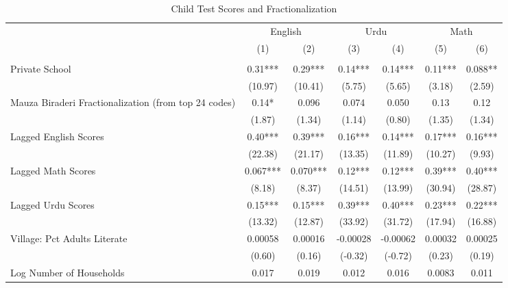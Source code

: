 \begin{sidewaystable}[htbp]\centering
\def\sym#1{\ifmmode^{#1}\else\(^{#1}\)\fi}
\caption{Child Test Scores and Fractionalization \label{kidsnointeract}}
\begin{tabular}{l*{6}{c}}
\toprule
                &\multicolumn{2}{c}{English}&\multicolumn{2}{c}{Urdu} &\multicolumn{2}{c}{Math} \\\cmidrule(lr){2-3}\cmidrule(lr){4-5}\cmidrule(lr){6-7}
                &\multicolumn{1}{c}{(1)}&\multicolumn{1}{c}{(2)}&\multicolumn{1}{c}{(3)}&\multicolumn{1}{c}{(4)}&\multicolumn{1}{c}{(5)}&\multicolumn{1}{c}{(6)}\\
                &\multicolumn{1}{c}{}&\multicolumn{1}{c}{}&\multicolumn{1}{c}{}&\multicolumn{1}{c}{}&\multicolumn{1}{c}{}&\multicolumn{1}{c}{}\\
\midrule
Private School  &     0.31***&     0.29***&     0.14***&     0.14***&     0.11***&    0.088** \\
                &  (10.97)   &  (10.41)   &   (5.75)   &   (5.65)   &   (3.18)   &   (2.59)   \\
Mauza Biraderi Fractionalization (from top 24 codes)&     0.14*  &    0.096   &    0.074   &    0.050   &     0.13   &     0.12   \\
                &   (1.87)   &   (1.34)   &   (1.14)   &   (0.80)   &   (1.35)   &   (1.34)   \\
Lagged English Scores&     0.40***&     0.39***&     0.16***&     0.14***&     0.17***&     0.16***\\
                &  (22.38)   &  (21.17)   &  (13.35)   &  (11.89)   &  (10.27)   &   (9.93)   \\
Lagged Math Scores&    0.067***&    0.070***&     0.12***&     0.12***&     0.39***&     0.40***\\
                &   (8.18)   &   (8.37)   &  (14.51)   &  (13.99)   &  (30.94)   &  (28.87)   \\
Lagged Urdu Scores&     0.15***&     0.15***&     0.39***&     0.40***&     0.23***&     0.22***\\
                &  (13.32)   &  (12.87)   &  (33.92)   &  (31.72)   &  (17.94)   &  (16.88)   \\
Village: Pct Adults Literate&  0.00058   &  0.00016   & -0.00028   & -0.00062   &  0.00032   &  0.00025   \\
                &   (0.60)   &   (0.16)   &  (-0.32)   &  (-0.72)   &   (0.23)   &   (0.19)   \\
Log Number of Households&    0.017   &    0.019   &    0.012   &    0.016   &   0.0083   &    0.011   \\

\end{tabular}
\end{sidewaystable}
